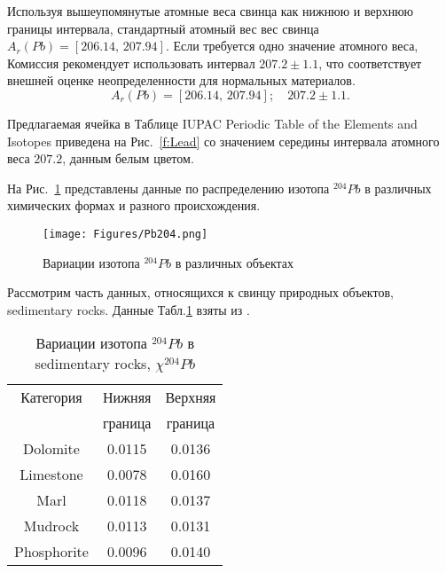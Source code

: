 \documentclass[a5paper,openany]{book}
\begin{document}
Используя вышеупомянутые атомные веса свинца как нижнюю и верхнюю границы интервала, стандартный атомный вес вес свинца $A_r(Pb) = [206.14,\, 207.94]$. Если требуется одно значение атомного веса, Комиссия рекомендует
использовать интервал $207.2 \pm 1.1$, что соответствует внешней оценке неопределенности
для нормальных материалов.
\begin{equation}
	A_r(Pb) = [206.14, \, 207.94]; \quad 207.2 \pm 1.1.
\end{equation}

Предлагаемая ячейка в Таблице IUPAC Periodic Table of the Elements and Isotopes \cite{IPTEI} приведена на Рис.~\ref{f:Lead} со значением середины интервала атомного веса $207.2$, данным белым цветом. 


На Рис.~\ref{f:204LeadVariation} представлены данные по распределению изотопа $^{204}Pb$ в различных химических формах и разного происхождения.
\begin{figure}[ht] 
	\centering\small
	\texttt{[image: Figures/Pb204.png]}
	\caption{Вариации изотопа $^{204}Pb$ в различных объектах} 
	\label{f:204LeadVariation}
\end{figure}

Рассмотрим часть данных, относящихся к свинцу природных объектов, sedimentary rocks. Данные Табл.\ref{t:204LeadVariation} взяты из \cite{IUPACLead}.
\begin{table}[h!]
	\begin{center}
		{\small
			\begin{tabular}{ccc}
				\hline
				Категория & Нижняя & Верхняя \\
				~ & граница & граница \\ 
				\hline
				Dolomite	& 0.0115 & 0.0136 \\
				Limestone	& 0.0078 & 0.0160 \\
				Marl 	& 0.0118 & 0.0137 \\
				Mudrock 	& 0.0113 & 0.0131 \\
				Phosphorite & 0.0096 & 0.0140 \\
				\hline
			\end{tabular}
		}
		\caption{Вариации изотопа $^{204}Pb$ в sedimentary rocks,  $ \chi ^{204}Pb$}
		\label{t:204LeadVariation}
	\end{center}
\end{table}
\end{document}
